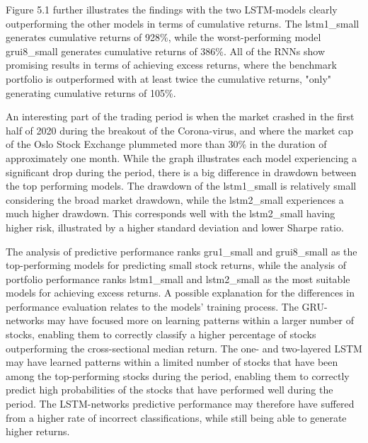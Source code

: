 \indent\newline 
Figure 5.1 further illustrates the findings with the two LSTM-models clearly outperforming the other models in terms of cumulative returns. The lstm1\_small generates cumulative returns of 928\%, while the worst-performing model grui8\_small generates cumulative returns of 386\%. All of the RNNs show promising results in terms of achieving excess returns, where the benchmark portfolio is outperformed with at least twice the cumulative returns, "only" generating cumulative returns of 105\%.  

\indent\newline 
An interesting part of the trading period is when the market crashed in the first half of 2020 during the breakout of the Corona-virus, and where the market cap of the Oslo Stock Exchange plummeted more than 30\% in the duration of approximately one month. While the graph illustrates each model experiencing a significant drop during the period, there is a big difference in drawdown between the top performing models. The drawdown of the lstm1\_small is relatively small considering the broad market drawdown, while the lstm2\_small experiences a much higher drawdown. This corresponds well with the lstm2\_small having higher risk, illustrated by a higher standard deviation and lower Sharpe ratio.    

\indent\newline
The analysis of predictive performance ranks gru1\_small and grui8\_small as the top-performing models for predicting small stock returns, while the analysis of portfolio performance ranks lstm1\_small and lstm2\_small as the most suitable models for achieving excess returns. A possible explanation for the differences in performance evaluation relates to the models' training process. The GRU-networks may have focused more on learning patterns within a larger number of stocks, enabling them to correctly classify a higher percentage of stocks outperforming the cross-sectional median return. The one- and two-layered LSTM may have learned patterns within a limited number of stocks that have been among the top-performing stocks during the period, enabling them to correctly predict high probabilities of the stocks that have performed well during the period. The LSTM-networks predictive performance may therefore have suffered from a higher rate of incorrect classifications, while still being able to generate higher returns.  

